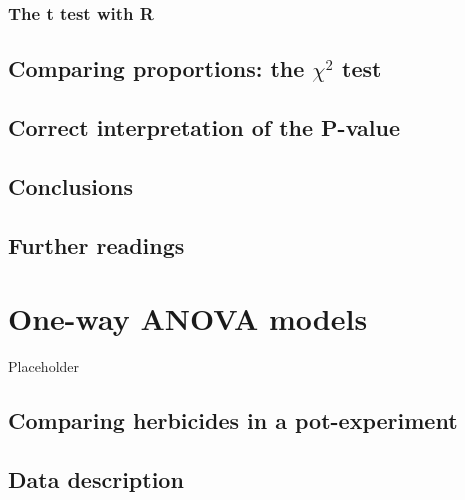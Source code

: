 \documentclass[a4paper,12pt,oneside]{book}
\begin{document}
\hypertarget{the-t-test-with-r}{%
\subsection{The t test with R}\label{the-t-test-with-r}}

\hypertarget{comparing-proportions-the-chi2-test}{%
\section{\texorpdfstring{Comparing proportions: the \(\chi^2\) test}{Comparing proportions: the \textbackslash chi\^{}2 test}}\label{comparing-proportions-the-chi2-test}}

\hypertarget{correct-interpretation-of-the-p-value}{%
\section{Correct interpretation of the P-value}\label{correct-interpretation-of-the-p-value}}

\hypertarget{conclusions-3}{%
\section{Conclusions}\label{conclusions-3}}

\hypertarget{further-readings-4}{%
\section{Further readings}\label{further-readings-4}}

\hypertarget{one-way-anova-models}{%
\chapter{One-way ANOVA models}\label{one-way-anova-models}}

Placeholder

\hypertarget{comparing-herbicides-in-a-pot-experiment}{%
\section{Comparing herbicides in a pot-experiment}\label{comparing-herbicides-in-a-pot-experiment}}

\hypertarget{data-description}{%
\section{Data description}\label{data-description}}
\end{document}
